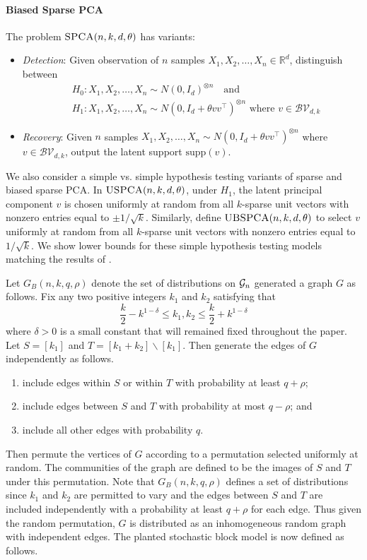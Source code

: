\documentclass[11pt]{article}
\begin{document}
\paragraph{Biased Sparse PCA} The problem $\textsc{SPCA}(n, k, d, \theta)$ has variants:
\begin{itemize}
\item \emph{Detection}: Given observation of $n$ samples $X_1, X_2, \dots, X_n \in \mathbb{R}^d$, distinguish between
\begin{align*}
&H_0: X_1, X_2, \dots, X_n \sim N(0, I_d)^{\otimes n} \quad \text{and} \\
&H_1 : X_1, X_2, \dots, X_n \sim N\left(0, I_d + \theta vv^\top\right)^{\otimes n} \text{ where } v \in \mathcal{BV}_{d, k}
\end{align*}
\item \emph{Recovery}: Given $n$ samples $X_1, X_2, \dots, X_n \sim N(0, I_d + \theta vv^\top)^{\otimes n}$ where $v \in\mathcal{BV}_{d, k}$, output the latent support $\text{supp}(v)$.
\end{itemize}

We also consider a simple vs. simple hypothesis testing variants of sparse and biased sparse PCA. In $\textsc{USPCA}(n, k, d, \theta)$, under $H_1$, the latent principal component $v$ is chosen uniformly at random from all $k$-sparse unit vectors with nonzero entries equal to $\pm 1/\sqrt{k}$. Similarly, define $\textsc{UBSPCA}(n, k, d, \theta)$ to select $v$ uniformly at random from all $k$-sparse unit vectors with nonzero entries equal to $1/\sqrt{k}$. We show lower bounds for these simple hypothesis testing models matching the results of \cite{gao2017sparse}.

Let $G_B(n, k, q, \rho)$ denote the set of distributions on $\mathcal{G}_n$ generated a graph $G$ as follows. Fix any two positive integers $k_1$ and $k_2$ satisfying that
$$\frac{k}{2} - k^{1-\delta} \le k_1, k_2 \le \frac{k}{2} + k^{1 - \delta}$$
where $\delta > 0$ is a small constant that will remained fixed throughout the paper. Let $S = [k_1]$ and $T = [k_1+k_2]\backslash [k_1]$. Then generate the edges of $G$ independently as follows.
\begin{enumerate}
\item include edges within $S$ or within $T$ with probability at least $q + \rho$;
\item include edges between $S$ and $T$ with probability at most $q - \rho$; and
\item include all other edges with probability $q$.
\end{enumerate}
Then permute the vertices of $G$ according to a permutation selected uniformly at random. The communities of the graph are defined to be the images of $S$ and $T$ under this permutation. Note that $G_B(n, k, q, \rho)$ defines a set of distributions since $k_1$ and $k_2$ are permitted to vary and the edges between $S$ and $T$ are included independently with a probability at least $q + \rho$ for each edge. Thus given the random permutation, $G$ is distributed as an inhomogeneous random graph with independent edges. The planted stochastic block model is now defined as follows.
\end{document}
